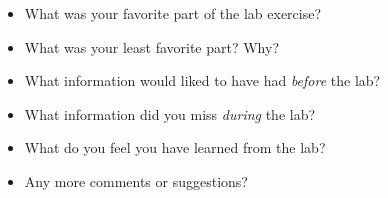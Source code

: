 \documentclass[a4,11pt, notitlepage]{article}
\begin{document}
\begin{itemize}
\item What was your favorite part of the lab exercise?
\vspace{3cm}

\item What was your least favorite part? Why?
\vspace{3cm}

\item What information would liked to have had \emph{before} the lab?
\vspace{3cm}

\item What information did you miss \emph{during} the lab?
\vspace{3cm}

\item What do you feel you have learned from the lab?
\vspace{3cm}

\item Any more comments or suggestions?
\vspace{5cm}

\end{itemize}
\end{document}
